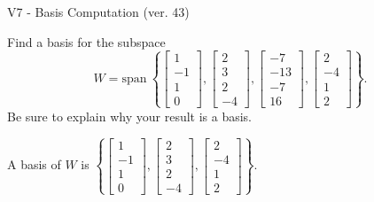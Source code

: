 \begin{exercise}
  \begin{exerciseTitle}V7 - Basis Computation (ver. 43)\end{exerciseTitle}
  \begin{exerciseStatement}
    Find a basis for the subspace 
\[W=\mathrm{span}\ \left\{\left[\begin{array}{r}
1 \\
-1 \\
1 \\
0
\end{array}\right] , \left[\begin{array}{r}
2 \\
3 \\
2 \\
-4
\end{array}\right] , \left[\begin{array}{r}
-7 \\
-13 \\
-7 \\
16
\end{array}\right] , \left[\begin{array}{r}
2 \\
-4 \\
1 \\
2
\end{array}\right]\right\}.\]
 Be sure to explain why your result is a basis.


  \end{exerciseStatement}
  \begin{exerciseAnswer}
   A basis of \(W\) is  \(\left\{\left[\begin{array}{r}
1 \\
-1 \\
1 \\
0
\end{array}\right] , \left[\begin{array}{r}
2 \\
3 \\
2 \\
-4
\end{array}\right] , \left[\begin{array}{r}
2 \\
-4 \\
1 \\
2
\end{array}\right]\right\}\).
  


  \end{exerciseAnswer}
\end{exercise}